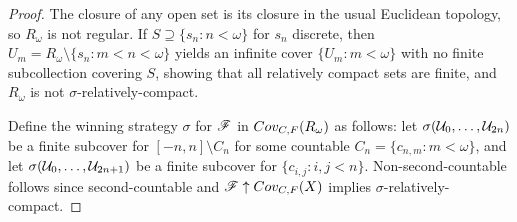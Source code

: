\begin{proof}
  The closure of any open set is its closure in the usual Euclidean topology,
  so $R_\omega$ is not regular. If $S\supseteq\{s_n:n<\omega\}$ for $s_n$
  discrete, then $U_m=R_\omega\setminus\{s_n:m<n<\omega\}$ yields an
  infinite cover $\{U_m:m<\omega\}$ with no finite subcollection covering $S$,
  showing that all relatively compact sets are finite, and $R_\omega$ is not
  $\sigma$-relatively-compact.

  Define the winning strategy $\sigma$ for $\mathscr{F}$ in $Cov_{C,F}(R_\omega)$ as
  follows: let $\sigma(\mathcal{U}_0,\dots,\mathcal{U}_{2n})$ be a finite subcover for
  $[-n,n]\setminus C_n$ for some countable $C_n=\{c_{n,m}: m<\omega\}$,
  and let $\sigma(\mathcal{U}_0,\dots,\mathcal{U}_{2n+1})$ be a finite subcover for
  $\{c_{i,j} : i,j < n\}$. Non-second-countable follows since
  second-countable and $\mathscr{F}\uparrow Cov_{C,F}(X)$ implies
  $\sigma$-relatively-compact.
\end{proof}















